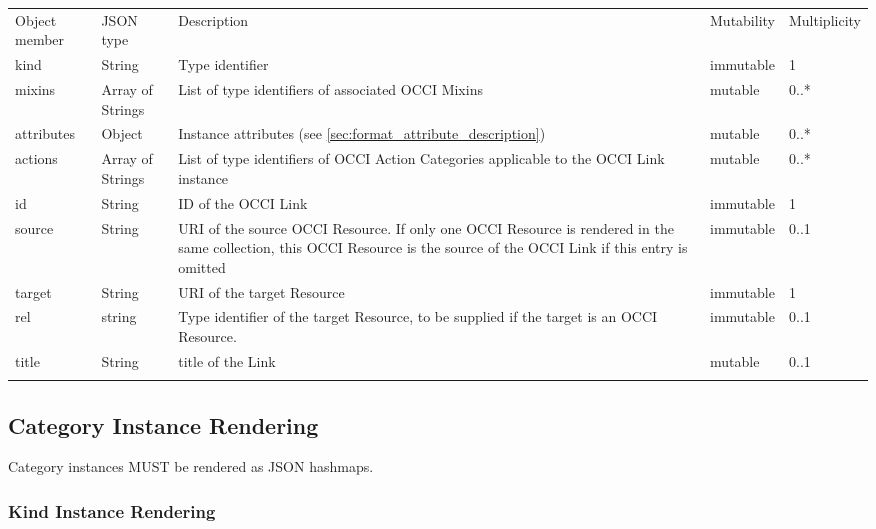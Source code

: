 \documentclass[10pt,a4paper]{article}
\begin{document}
 {
    \begin{tabularx}{\textwidth}{llXll}
    \toprule
    Object member & JSON type & Description & Mutability & Multiplicity \\
    \colrule
    kind & String & Type identifier & immutable & 1 \\

    mixins & Array of Strings & List of type identifiers of associated OCCI
Mixins &
    mutable & 0..* \\

    attributes & Object & Instance attributes (see
\ref{sec:format_attribute_description}) & mutable & 0..* \\
    
    actions & Array of Strings & List of type identifiers of OCCI
Action Categories applicable to the OCCI Link instance & mutable & 0..* \\
    
    id & String & ID of the OCCI Link & immutable & 1\\
        
    source & String & URI of the source OCCI Resource. If only one OCCI 
Resource is rendered in the same collection, this OCCI Resource is the 
source of the OCCI Link if this entry is omitted & immutable & 0..1\\
    
    target & String & URI of the target Resource & immutable & 1\\
         
    rel & string & Type identifier of the target Resource, to be supplied if
the target is an OCCI Resource. & immutable & 0..1 \\
	title & String & title of the Link & mutable & 0..1\\
    \botrule
    \end{tabularx}
}



\subsection{Category Instance Rendering}
\label{sec:format_category_instance_rendering}
Category instances MUST be rendered as JSON hashmaps.

\subsubsection{Kind Instance Rendering}
\label{sec:format_kind}
\end{document}
